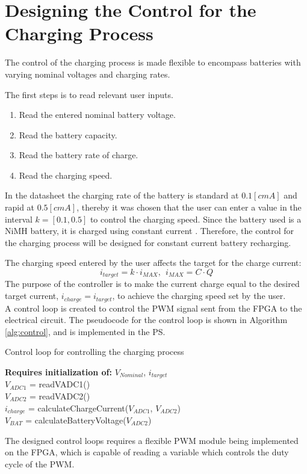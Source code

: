 \documentclass[../report.tex]{subfiles}
\begin{document}
\section{Designing the Control for the Charging Process}
The control of the charging process is made flexible to encompass batteries with varying nominal voltages and charging rates.

The first steps is to read relevant user inputs.
\begin{enumerate}
    \item Read the entered nominal battery voltage.
    \item Read the battery capacity.
    \item Read the battery rate of charge.
    \item Read the charging speed.
\end{enumerate}
In the datasheet \cite{rsbattery} the charging rate of the battery is standard at $0.1 [cmA]$ and rapid at $0.5 [cmA]$, thereby it was chosen that the user can enter a value in the interval $k =[0.1, 0.5]$ to control the charging speed. Since the battery used is a NiMH battery, it is charged using constant current \cite{avr450}. Therefore, the control for the charging process will be designed for constant current battery recharging.

The charging speed entered by the user affects the target for the charge current:
\begin{equation}
    i_{target} = k \cdot i_{MAX},\ \  i_{MAX} = C \cdot Q
\end{equation}
The purpose of the controller is to make the current charge equal to the desired target current, $i_{charge} = i_{target}$, to achieve the charging speed set by the user.\\
A control loop is created to control the PWM signal sent from the FPGA to the electrical circuit. The pseudocode for the control loop is shown in Algorithm \ref{alg:control}, and is implemented in the PS.\\
\begin{algorithm}[H]
\caption{Control loop for controlling the charging process}
\SetAlgoLined
\textbf{Requires initialization of:} $V_{Nominal}$, $i_{target}$  \\
 {
    \nl $V_{ADC1}$ = readVADC1()\\
    \nl $V_{ADC2}$ = readVADC2()\\
    \nl $i_{charge}$ = calculateChargeCurrent($V_{ADC1}$, $V_{ADC2}$)\\
    \nl $V_{BAT}$ = calculateBatteryVoltage($V_{ADC2}$)
}
\label{alg:control}
\end{algorithm}
The designed control loops requires a flexible PWM module being implemented on the FPGA, which is capable of reading a variable which controls the duty cycle of the PWM.
\end{document}
